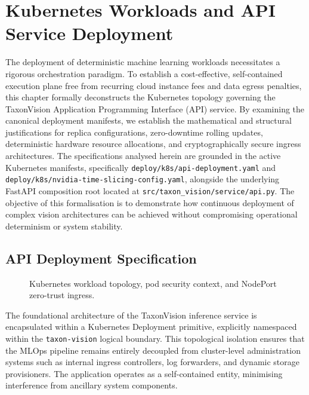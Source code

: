 \chapter{Kubernetes Workloads and API Service Deployment}
\label{ch:kubernetes_workloads_api}

The deployment of deterministic machine learning workloads necessitates a rigorous orchestration paradigm. To establish a cost-effective, self-contained execution plane free from recurring cloud instance fees and data egress penalties, this chapter formally deconstructs the Kubernetes topology governing the TaxonVision Application Programming Interface (API) service. By examining the canonical deployment manifests, we establish the mathematical and structural justifications for replica configurations, zero-downtime rolling updates, deterministic hardware resource allocations, and cryptographically secure ingress architectures. The specifications analysed herein are grounded in the active Kubernetes manifests, specifically \texttt{deploy/k8s/api-deployment.yaml} and \texttt{deploy/k8s/nvidia-time-slicing-config.yaml}, alongside the underlying FastAPI composition root located at \texttt{src/taxon\_vision/service/api.py}. The objective of this formalisation is to demonstrate how continuous deployment of complex vision architectures can be achieved without compromising operational determinism or system stability.

\section{API Deployment Specification}
\label{sec:api_deployment_specification}

\begin{figure}[htbp]
\centering

\caption{Kubernetes workload topology, pod security context, and NodePort zero-trust ingress.}
\label{fig:k3s_workloads_and_storage}
\end{figure}

The foundational architecture of the TaxonVision inference service is encapsulated within a Kubernetes Deployment primitive, explicitly namespaced within the \texttt{taxon-vision} logical boundary. This topological isolation ensures that the MLOps pipeline remains entirely decoupled from cluster-level administration systems such as internal ingress controllers, log forwarders, and dynamic storage provisioners. The application operates as a self-contained entity, minimising interference from ancillary system components.

